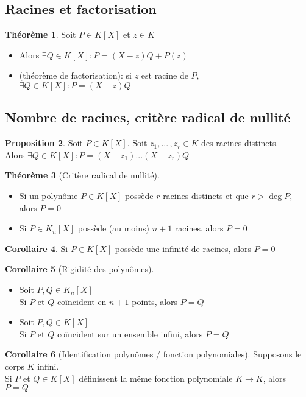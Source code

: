 \documentclass[10pt,a4paper]{article}
\theoremstyle{definition}
\newtheorem{proposition}{Proposition}[section]
\newtheorem{theorem}[proposition]{Théorème}
\newtheorem{corollaire}[proposition]{Corollaire}
\begin{document}
\subsection{Racines et factorisation}
\begin{theorem}
Soit $P \in K[X]$ et $z \in K$
\begin{itemize}
\item Alors $\exists Q \in K[X]: P = (X - z)Q + P(z)$
\item (théorème de factorisation): si $z$ est racine de $P$, $\exists Q \in K[X]: P = (X - z)Q$
\end{itemize}
\end{theorem}

\subsection{Nombre de racines, critère radical de nullité}
\begin{proposition}
Soit $P \in K[X]$. Soit $z_1, ...\,, z_r \in K$ des racines distincts. \\
Alors $\exists Q \in K[X]: P = (X - z_1) ... (X - z_r) Q$
\end{proposition}
\begin{theorem}[Critère radical de nullité]
\hfill
\begin{itemize}
\item Si un polynôme $P \in K[X]$ possède $r$ racines distincts et que $r > \deg P$, alors $P = 0$
\item Si $P \in K_n[X]$ possède (au moins) $n + 1$ racines, alors $P = 0$
\end{itemize}
\end{theorem}
\begin{corollaire}
Si $P \in K[X]$ possède une infinité de racines, alors $P = 0$
\end{corollaire}
\begin{corollaire}[Rigidité des polynômes]
\hfill
\begin{itemize}
\item Soit $P, Q \in K_n[X]$ \\
Si $P$ et $Q$ coïncident en $n + 1$ points, alors $P = Q$
\item Soit $P, Q \in K[X]$ \\
Si $P$ et $Q$ coïncident sur un ensemble infini, alors $P = Q$
\end{itemize}
\end{corollaire}
\begin{corollaire}[Identification polynômes / fonction polynomiales]
Supposons le corps $K$ infini. \\
Si $P$ et $Q \in K[X]$ définissent la même fonction polynomiale $K \to K$, alors $P = Q$
\end{corollaire}
\end{document}

